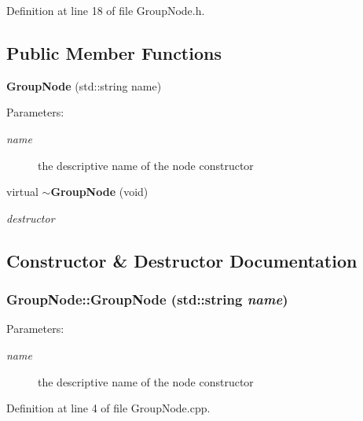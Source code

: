 Definition at line 18 of file GroupNode.h.\subsection*{Public Member Functions}
\begin{CompactItemize}
\item 
{\bf GroupNode} (std::string name)
\begin{CompactList}\small\item\em \begin{Desc}
\item[Parameters:]
\begin{description}
\item[{\em name}]the descriptive name of the node constructor \end{description}
\end{Desc}
\item\end{CompactList}\item 
virtual {\bf $\sim$GroupNode} (void)
\begin{CompactList}\small\item\em destructor \item\end{CompactList}\end{CompactItemize}


\subsection{Constructor \& Destructor Documentation}
\subsubsection{\setlength{\rightskip}{0pt plus 5cm}GroupNode::GroupNode (std::string {\em name})}\label{classGroupNode_a692e635b5fe5ddb4ecad4aecae7d267}


\begin{Desc}
\item[Parameters:]
\begin{description}
\item[{\em name}]the descriptive name of the node constructor \end{description}
\end{Desc}




Definition at line 4 of file GroupNode.cpp.
